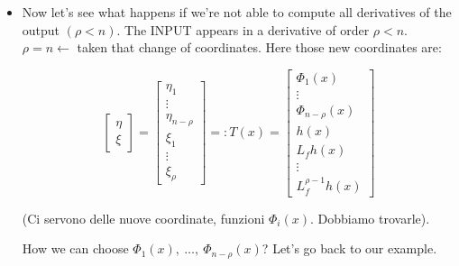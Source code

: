 \begin{itemize}
(CHAIN OF INTEGRATORS), which is linear. $y^{(\rho)} = w$; let's rewrite:
\[
	\dot{z}=A_z + B\gamma (x)(u - \alpha (x))
\]

(FORMA CANONICA). 

\[
	\left\{
	\begin{aligned}
	&\dot{\xi} = A_c\xi + B_e\gamma (x)(u-\alpha (x)) \\
	&\gamma(x) = L_gL^{n-1}_fh(x),\ \alpha(x) = -\frac{L^n_fh(x)}{L_gL^{n-1}_fh(x)} = -\frac{L^n_fh(x)}{\gamma(x)}
	\end{aligned}
	\right.
\]

$[\dot{\xi} = A_c\xi + B_cw]$; by using that INPUT. And therefore we can track any trajectory we want to follow. Se riusciamo a derivare l'uscita per n volte, allora abbiamo immediatamente feedback linearizzato il sistema, ma anche come piace a noi. Nelle nuove coordinate abbiamo direttamente un sistema in forma CANONICA. Sistema risultante sulla quale si può applicare direttamente inseguimento di traiettoria o stabilizzazione.
\item Now let's see what happens if we're not able to compute all derivatives of the output $(\rho < n)$. The INPUT appears in a derivative of order $\rho < n$. $\rho = n \leftarrow$ taken that change of coordinates. Here those new coordinates are:

\[
	\begin{bmatrix}\eta\\ \xi\end{bmatrix} = \begin{bmatrix}\eta_1 \\ \vdots \\ \eta_{n-\rho} \\ \xi_1 \\ \vdots \\ \xi_\rho\end{bmatrix} =: T(x) = \begin{bmatrix}\Phi_1(x) \\ \vdots \\ \Phi_{n-\rho}(x)\\ h(x) \\ L_fh(x) \\ \vdots \\ L^{\rho-1}_fh(x)\end{bmatrix}
\]

(Ci servono delle nuove coordinate, funzioni $\Phi_i(x)$. Dobbiamo trovarle).

How we can choose $\Phi_1(x),\ \dots,\ \Phi_{n-\rho}(x)$? Let's go back to our example.


\end{itemize}

